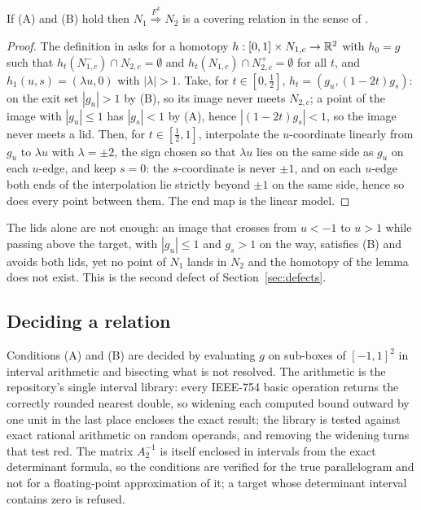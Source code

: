 \documentclass[11pt]{article}
\newcommand{\cover}[1]{\stackrel{#1}{\Longrightarrow}}
\begin{document}
\begin{lemma}\label{lem:cover}
If (A) and (B) hold then $N_1\cover{F^k}N_2$ is a covering relation in the sense of \cite{ZG04}.
\end{lemma}

\begin{proof}
The definition in \cite{ZG04} asks for a homotopy $h:[0,1]\times N_{1,c}\to\mathbb{R}^2$ with $h_0=g$ such that
$h_t(N_{1,c}^-)\cap N_{2,c}=\emptyset$ and $h_t(N_{1,c})\cap N_{2,c}^+=\emptyset$ for all $t$, and $h_1(u,s)=(\lambda u,0)$
with $|\lambda|>1$. Take, for $t\in[0,\tfrac12]$, $h_t=(g_u,(1-2t)g_s)$: on the exit set $|g_u|>1$ by (B), so its
image never meets $N_{2,c}$; a point of the image with $|g_u|\le1$ has $|g_s|<1$ by (A), hence $|(1-2t)g_s|<1$, so the
image never meets a lid. Then, for $t\in[\tfrac12,1]$, interpolate the $u$-coordinate linearly from $g_u$ to
$\lambda u$ with $\lambda=\pm2$, the sign chosen so that $\lambda u$ lies on the same side as $g_u$ on each
$u$-edge, and keep $s=0$: the $s$-coordinate is never $\pm1$, and on each $u$-edge both ends of the interpolation lie
strictly beyond $\pm1$ on the same side, hence so does every point between them. The end map is the linear model.
\end{proof}

The lids alone are not enough: an image that crosses from $u<-1$ to $u>1$ while passing above the target, with
$|g_u|\le1$ and $g_s>1$ on the way, satisfies (B) and avoids both lids, yet no point of $N_1$ lands in $N_2$ and the
homotopy of the lemma does not exist. This is the second defect of Section~\ref{sec:defects}.

\subsection{Deciding a relation}

Conditions (A) and (B) are decided by evaluating $g$ on sub-boxes of $[-1,1]^2$ in interval arithmetic and
bisecting what is not resolved. The arithmetic is the repository's single interval library: every IEEE-754 basic
operation returns the correctly rounded nearest double, so widening each computed bound outward by one unit in the
last place encloses the exact result; the library is tested against exact rational arithmetic on random operands,
and removing the widening turns that test red. The matrix $A_2^{-1}$ is itself enclosed in intervals from the exact
determinant formula, so the conditions are verified for the true parallelogram and not for a floating-point
approximation of it; a target whose determinant interval contains zero is refused.
\end{document}
